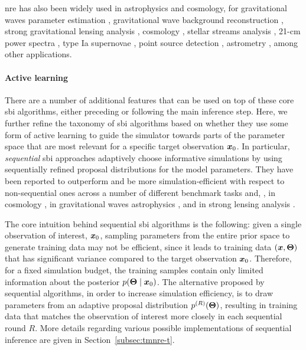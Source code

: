 \Gls*{nre} has also been widely used in astrophysics and cosmology, for gravitational waves parameter estimation \cite{Bhardwaj:2023xph, Alvey:2023naa}, gravitational wave background reconstruction \cite{Alvey:2023npw}, strong gravitational lensing analysis \cite{Brehmer:2019jyt, Zhang:2022djp, Montel:2022fhv, Coogan:2022cky}, cosmology \cite{Cole:2021gwr, List:2023aa, FrancoAbellan:2024tbj}, stellar streams analysis \cite{Hermans:2020skz, albatross}, 21-cm power spectra \cite{Saxena:2023tue}, type Ia supernovae \cite{Karchev:2022xyn, Karchev:2024stw}, point source detection \cite{AnauMontel:2022ppb}, astrometry \cite{Mishra-Sharma:2021nhh}, among other applications. 


\paragraph*{Active learning} There are a number of additional features that can be used on top of these core \gls*{sbi} algorithms, either preceding or following the main inference step. Here, we further refine the taxonomy of \gls*{sbi} algorithms based on whether they use some form of {active learning} to guide the simulator towards parts of the parameter space that are most relevant for a specific target observation $\bm{x}_0$. In particular, \emph{sequential} \gls*{sbi} approaches adaptively choose informative simulations by using sequentially refined proposal distributions for the model parameters. They have been reported to outperform and be more simulation-efficient with respect to non-sequential ones across a number of different benchmark tasks \citep{Lueckmann:2021aa} and, \eg, in cosmology \cite{Cole:2021gwr}, in gravitational waves astrophysics \cite{Bhardwaj:2023xph}, and in strong lensing analysis \cite{wagnercarena2024strong}. 

The core intuition behind sequential \gls*{sbi} algorithms is the following: given a single observation of interest, $\bm{x}_0$, sampling parameters from the entire prior space to generate training data may not be efficient, since it leads to training data $(\bm{x}, \bm{\Theta})$ that has significant variance compared to the target observation $\bm{x}_0$. Therefore, for a fixed simulation budget, the training samples contain only limited information about the posterior $p(\bm{\Theta}\mid\bm{x}_0)$. The alternative proposed by sequential algorithms, in order to increase simulation efficiency, is to draw parameters from an adaptive proposal distribution $p^{(R)}(\bm{\Theta})$, resulting in training data that matches the observation of interest more closely in each sequential round $R$. More details regarding various possible implementations of sequential inference are given in Section~\ref{subsec:tmnre-t}.


